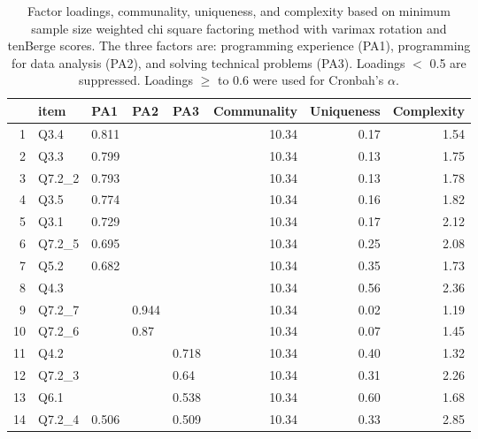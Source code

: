 \documentclass[020-persona\_validation.tex]{subfiles}
\begin{document}
        \begin{table}[ht]
            \centering
            \caption[3-factor item loadings]
            {Factor loadings, communality, uniqueness, and complexity
                based on minimum sample size weighted chi square factoring method with varimax rotation and tenBerge scores.
                The three factors are:
                programming experience (PA1),
                programming for data analysis (PA2), and
                solving technical problems (PA3).
                Loadings $<$ 0.5 are suppressed.
                Loadings $\ge$ to 0.6 were used for Cronbah's $\alpha$.
            }
            \begin{tabular}{rllllrrr}
                \hline
               & item & PA1 & PA2 & PA3 & Communality & Uniqueness & Complexity \\
                \hline
              1 & Q3.4 & 0.811 &  &  & 10.34 & 0.17 & 1.54 \\
                2 & Q3.3 & 0.799 &  &  & 10.34 & 0.13 & 1.75 \\
                3 & Q7.2\_2 & 0.793 &  &  & 10.34 & 0.13 & 1.78 \\
                4 & Q3.5 & 0.774 &  &  & 10.34 & 0.16 & 1.82 \\
                5 & Q3.1 & 0.729 &  &  & 10.34 & 0.17 & 2.12 \\
                6 & Q7.2\_5 & 0.695 &  &  & 10.34 & 0.25 & 2.08 \\
                7 & Q5.2 & 0.682 &  &  & 10.34 & 0.35 & 1.73 \\
                8 & Q4.3 &  &  &  & 10.34 & 0.56 & 2.36 \\
                9 & Q7.2\_7 &  & 0.944 &  & 10.34 & 0.02 & 1.19 \\
                10 & Q7.2\_6 &  & 0.87 &  & 10.34 & 0.07 & 1.45 \\
                11 & Q4.2 &  &  & 0.718 & 10.34 & 0.40 & 1.32 \\
                12 & Q7.2\_3 &  &  & 0.64 & 10.34 & 0.31 & 2.26 \\
                13 & Q6.1 &  &  & 0.538 & 10.34 & 0.60 & 1.68 \\
                14 & Q7.2\_4 & 0.506 &  & 0.509 & 10.34 & 0.33 & 2.85 \\
                 \hline
              \end{tabular}
            \label{tab:fa-3}
        \end{table}
\end{document}

